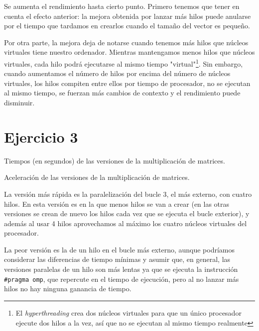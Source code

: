 \documentclass{apuntes}
\begin{document}
Se aumenta el rendimiento hasta cierto punto. Primero tenemos que tener en cuenta el efecto anterior: la mejora obtenida por lanzar más hilos puede anularse por el tiempo que tardamos en crearlos cuando el tamaño del vector es pequeño.

Por otra parte, la mejora deja de notarse cuando tenemos más hilos que núcleos virtuales tiene nuestro ordenador. Mientras mantengamos menos hilos que núcleos virtuales, cada hilo podrá ejecutarse al mismo tiempo "virtual"\footnote{El \textit{hyperthreading} crea dos núcleos virtuales para que un único procesador ejecute dos hilos a la vez, así que no se ejecutan al mismo tiempo realmente}. Sin embargo, cuando aumentamos el número de hilos por encima del número de núcleos virtuales, los hilos compiten entre ellos por tiempo de procesador, no se ejecutan al mismo tiempo, se fuerzan más cambios de contexto y el rendimiento puede disminuir.


\section*{Ejercicio 3}

\begin{table}[hbtp]
\centering

\caption{Tiempos (en segundos) de las versiones de la multiplicación de matrices.}
\label{tblEj3Tiempos}
\end{table}


\begin{table}[hbtp]
\centering

\caption{Aceleración de las versiones de la multiplicación de matrices.}
\label{tblEj3Accel}
\end{table}

La versión más rápida es la paralelización del bucle 3, el más externo, con cuatro hilos. En esta versión es en la que menos hilos se van a crear (en las otras versiones se crean de nuevo los hilos cada vez que se ejecuta el bucle exterior), y además al usar 4 hilos aprovechamos al máximo los cuatro núcleos virtuales del procesador.

La peor versión es la de un hilo en el bucle más externo, aunque podríamos considerar las diferencias de tiempo mínimas y asumir que, en general, las versiones paralelas de un hilo son más lentas ya que se ejecuta la instrucción \texttt{\#pragma omp}, que repercute en el tiempo de ejecución, pero al no lanzar más hilos no hay ninguna ganancia de tiempo.
\end{document}

